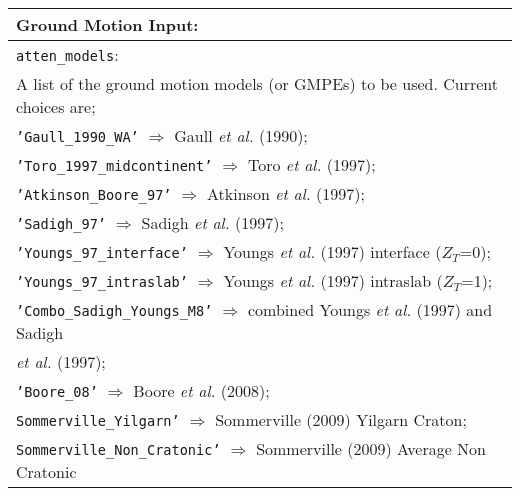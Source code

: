 \documentclass[a4paper, 12pt]{report}
\begin{document}
\vspace{2em}
\begin{tabular}{|p{\textwidth}|}
\hline
\vspace{0.3em} \noindent \Large \textbf{Ground Motion Input:} \normalsize \\
\hline \vspace{0.1em} \texttt{atten\_models}: \\
A list of the ground motion models (or GMPEs) to be used. Current choices are; \\
 \hspace{0.5em} \texttt{'Gaull\_1990\_WA'} $\Rightarrow$ Gaull \textit{et al.} (1990); \\
 \hspace{0.5em}  \texttt{'Toro\_1997\_midcontinent'}  $\Rightarrow$ Toro \textit{et al.} (1997); \\
 \hspace{0.5em}  \texttt{'Atkinson\_Boore\_97'}  $\Rightarrow$ Atkinson \textit{et al.} (1997); \\
 \hspace{0.5em}  \texttt{'Sadigh\_97'}  $\Rightarrow$ Sadigh \textit{et al.} (1997); \\
 \hspace{0.5em}  \texttt{'Youngs\_97\_interface'}  $\Rightarrow$ Youngs \textit{et al.} (1997) interface ($Z_T$=0); \\
 \hspace{0.5em}  \texttt{'Youngs\_97\_intraslab'}  $\Rightarrow$ Youngs \textit{et al.} (1997) intraslab ($Z_T$=1); \\
 \hspace{0.5em}  \texttt{'Combo\_Sadigh\_Youngs\_M8'}  $\Rightarrow$ combined Youngs \textit{et al.} (1997) and Sadigh \\
 \hspace{14.5em} \textit{et al.} (1997); \\
 \hspace{0.5em}  \texttt{'Boore\_08'}  $\Rightarrow$ Boore \textit{et al.} (2008); \\
 \hspace{0.5em} \texttt{Sommerville\_Yilgarn'} $\Rightarrow$ Sommerville (2009) Yilgarn Craton; \\
  \hspace{0.5em} \texttt{Sommerville\_Non\_Cratonic'} $\Rightarrow$ Sommerville (2009) Average Non Cratonic \\

\end{tabular}
\end{document}
